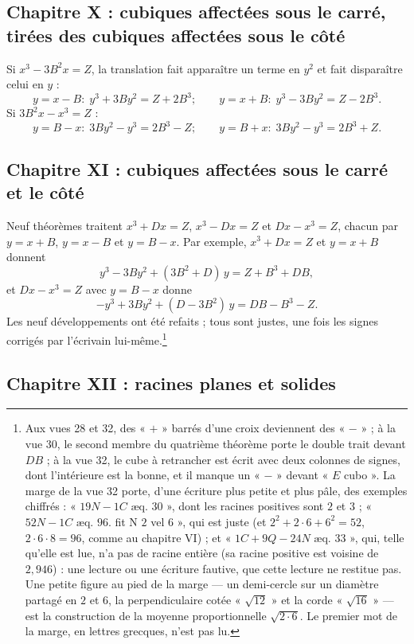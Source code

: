 \documentclass[11pt,a4paper]{article}
\begin{document}
\subsection*{Chapitre X : cubiques affectées sous le carré, tirées des cubiques affectées sous le côté}

Si $x^3 - 3B^2x = Z$, la translation fait apparaître un terme en $y^2$ et fait
disparaître celui en $y$ :
\[ y = x - B : \; y^3 + 3By^2 = Z + 2B^3 ; \qquad
   y = x + B : \; y^3 - 3By^2 = Z - 2B^3 . \]
Si $3B^2x - x^3 = Z$ :
\[ y = B - x : \; 3By^2 - y^3 = 2B^3 - Z ; \qquad
   y = B + x : \; 3By^2 - y^3 = 2B^3 + Z . \]

\subsection*{Chapitre XI : cubiques affectées sous le carré et le côté}

Neuf théorèmes traitent $x^3 + Dx = Z$, $x^3 - Dx = Z$ et $Dx - x^3 = Z$, chacun
par $y = x + B$, $y = x - B$ et $y = B - x$. Par exemple, $x^3 + Dx = Z$ et
$y = x + B$ donnent
\[ y^3 - 3By^2 + (3B^2 + D)\,y = Z + B^3 + DB , \]
et $Dx - x^3 = Z$ avec $y = B - x$ donne
\[ -y^3 + 3By^2 + (D - 3B^2)\,y = DB - B^3 - Z . \]
Les neuf développements ont été refaits ; tous sont justes, une fois les signes
corrigés par l'écrivain lui-même.\footnote{Aux vues 28 et 32, des « $+$ »
barrés d'une croix deviennent des « $-$ » ; à la vue 30, le second membre du
quatrième théorème porte le double trait devant $DB$ ; à la vue 32, le cube à
retrancher est écrit avec deux colonnes de signes, dont l'intérieure est la
bonne, et il manque un « $-$ » devant « $E$ cubo ». La marge de la vue 32 porte,
d'une écriture plus petite et plus pâle, des exemples chiffrés :
« $19N - 1C$ æq. $30$ », dont les racines positives sont $2$ et $3$ ;
« $52N - 1C$ æq. $96$. fit N $2$ vel $6$ », qui est juste (et $2^2 + 2 \cdot 6 + 6^2
= 52$, $2 \cdot 6 \cdot 8 = 96$, comme au chapitre VI) ; et
« $1C + 9Q - 24N$ æq. $33$ », qui, telle qu'elle est lue, n'a pas de racine
entière (sa racine positive est voisine de $2{,}946$) : une lecture ou une
écriture fautive, que cette lecture ne restitue pas. Une petite figure au pied
de la marge — un demi-cercle sur un diamètre partagé en $2$ et $6$, la
perpendiculaire cotée « $\sqrt{12}$ » et la corde « $\sqrt{16}$ » — est la
construction de la moyenne proportionnelle $\sqrt{2 \cdot 6}$. Le premier mot de
la marge, en lettres grecques, n'est pas lu.}

\subsection*{Chapitre XII : racines planes et solides}
\end{document}
